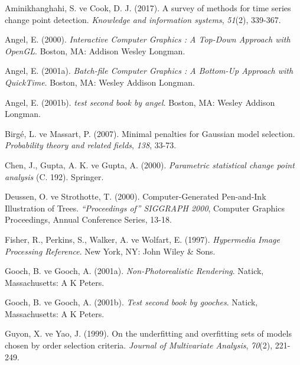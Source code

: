 \documentclass[12pt,twoside]{deuthesis}
\begin{document}
\hypertarget{refs}{}
\begin{CSLReferences}{1}{0}
\leavevmode{}%
Aminikhanghahi, S. ve Cook, D. J. (2017). A survey of methods for time series change point detection. \emph{Knowledge and information systems}, \emph{51}(2), 339-367.

\leavevmode{}%
Angel, E. (2000). \emph{Interactive Computer Graphics : A Top-Down Approach with OpenGL}. Boston, MA: Addison Wesley Longman.

\leavevmode{}%
Angel, E. (2001a). \emph{Batch-file Computer Graphics : A Bottom-Up Approach with QuickTime}. Boston, MA: Wesley Addison Longman.

\leavevmode{}%
Angel, E. (2001b). \emph{test second book by angel}. Boston, MA: Wesley Addison Longman.

\leavevmode{}%
Birgé, L. ve Massart, P. (2007). Minimal penalties for Gaussian model selection. \emph{Probability theory and related fields}, \emph{138}, 33-73.

\leavevmode{}%
Chen, J., Gupta, A. K. ve Gupta, A. (2000). \emph{Parametric statistical change point analysis} (C. 192). Springer.

\leavevmode{}%
Deussen, O. ve Strothotte, T. (2000). Computer-Generated Pen-and-Ink Illustration of Trees. \emph{{``Proceedings of''} SIGGRAPH 2000}, Computer Graphics Proceedings, Annual Conference Series, 13-18.

\leavevmode{}%
Fisher, R., Perkins, S., Walker, A. ve Wolfart, E. (1997). \emph{Hypermedia Image Processing Reference}. New York, NY: John Wiley \& Sons.

\leavevmode{}%
Gooch, B. ve Gooch, A. (2001a). \emph{{Non-Photorealistic Rendering}}. Natick, Massachusetts: A K Peters.

\leavevmode{}%
Gooch, B. ve Gooch, A. (2001b). \emph{Test second book by gooches}. Natick, Massachusetts: A K Peters.

\leavevmode{}%
Guyon, X. ve Yao, J. (1999). On the underfitting and overfitting sets of models chosen by order selection criteria. \emph{Journal of Multivariate Analysis}, \emph{70}(2), 221-249.


\end{CSLReferences}
\end{document}

